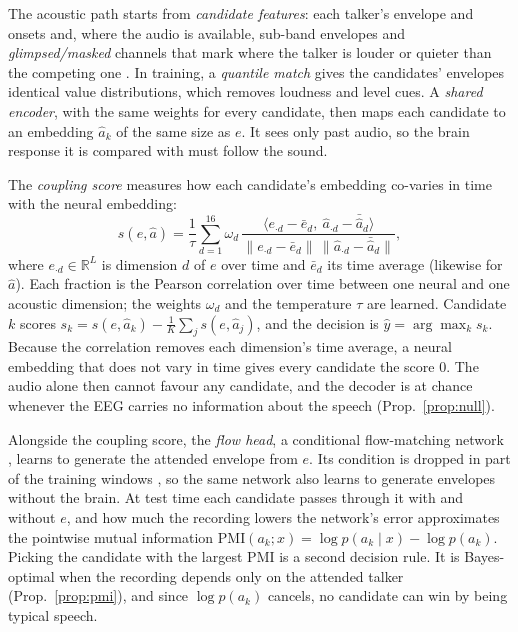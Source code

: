 \documentclass[twoside]{article}
\newcommand{\PMI}{\mathrm{PMI}}
\begin{document}
The acoustic path starts from \emph{candidate features}: each talker's envelope and onsets
and, where the audio is available, sub-band envelopes and \emph{glimpsed/masked} channels
that mark where the talker is louder or quieter than the competing one
\citep{brodbeck2020neural}. In training, a \emph{quantile match} gives the candidates'
envelopes identical value distributions, which removes loudness and level cues. A
\emph{shared encoder}, with the same weights for every candidate, then maps each candidate
to an embedding $\hat a_k$ of the same size as $e$. It sees only past audio, so the brain
response it is compared with must follow the sound.

The \emph{coupling score} measures how each candidate's embedding co-varies in time with
the neural embedding:
\begin{equation}
s(e,\hat a)=\frac{1}{\tau}\sum_{d=1}^{16} \omega_d\,
\frac{\langle e_{\cdot d}-\bar e_d,\ \hat a_{\cdot d}-\bar{\hat a}_{d}\rangle}
{\|e_{\cdot d}-\bar e_d\|\,\|\hat a_{\cdot d}-\bar{\hat a}_{d}\|},
\label{eq:score}
\end{equation}
where $e_{\cdot d}\in\mathbb R^{L}$ is dimension $d$ of $e$ over time and $\bar e_d$ its time
average (likewise for $\hat a$). Each fraction is the Pearson correlation over time between one
neural and one acoustic dimension; the weights $\omega_d$ and the temperature $\tau$ are
learned. Candidate $k$ scores $s_k=s(e,\hat a_k)-\frac1K\sum_{j}s(e,\hat a_j)$, and the
decision is $\hat y=\arg\max_k s_k$. Because the correlation removes each dimension's time
average, a neural embedding that does not vary in time gives every candidate the score 0.
The audio alone then cannot favour any candidate, and the decoder is at chance whenever the
EEG carries no information about the speech (Prop.~\ref{prop:null}).

Alongside the coupling score, the \emph{flow head}, a conditional flow-matching network
\citep{lipman2023flow}, learns to generate the attended envelope from $e$. Its condition is
dropped in part of the training windows \citep{ho2022classifierfree}, so the same network
also learns to generate envelopes without the brain. At test time each candidate passes
through it with and without $e$, and how much the recording lowers the network's error
approximates the pointwise mutual information $\PMI(a_k;x)=\log p(a_k\mid x)-\log p(a_k)$.
Picking the candidate with the largest PMI is a second decision rule. It is Bayes-optimal
when the recording depends only on the attended talker (Prop.~\ref{prop:pmi}), and since
$\log p(a_k)$ cancels, no candidate can win by being typical speech.
\end{document}
